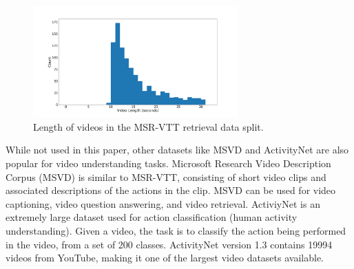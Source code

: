\begin{figure}[h]
      \centering
      \includegraphics[width=0.7\textwidth]{figures/msr-vtt-length-histogram.png}
      \caption{Length of videos in the MSR-VTT retrieval data split.}
      \label{fig:length_histogram}
\end{figure}

While not used in this paper, other datasets like MSVD \cite{msvd} and ActivityNet \cite{activitynet} are also popular for video understanding tasks.
Microsoft Research Video Description Corpus (MSVD) is similar to MSR-VTT, consisting of short video clips and associated descriptions of the actions in the clip.
MSVD can be used for video captioning, video question answering, and video retrieval.
ActiviyNet is an extremely large dataset used for action classification (human activity understanding).
Given a video, the task is to classify the action being performed in the video, from a set of 200 classes.
ActivityNet version 1.3 contains 19994 videos from YouTube, making it one of the largest video datasets available.
